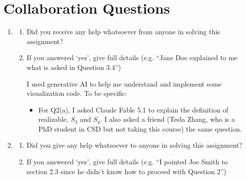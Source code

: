 \section{Collaboration Questions}

\begin{enumerate}
    \item
    \begin{enumerate}
        \item Did you receive any help whatsoever from anyone in solving this assignment?

        \item If you answered `yes', give full details (e.g. “Jane Doe explained to me what is asked in Question 3.4”)\\

        \begin{tcolorbox}[fit,height=4cm, width=15cm, blank, borderline={1pt}{-2pt},nobeforeafter]

        I used generative AI to help me understand and implement some visualization code. To be specific:
            \begin{itemize}
                \item For Q2(a), I asked Claude Fable 5.1 to explain the definition of realizable, $S_3$ and $S_4$. I also asked a friend (Tesla Zhang, who is a PhD student in CSD but not taking this course) the same question.
            \end{itemize}

        \end{tcolorbox}

    \end{enumerate}


    \item
    \begin{enumerate}
        \item Did you give any help whatsoever to anyone in solving this assignment?


        \item If you answered `yes', give full details (e.g. “I pointed Joe Smith to section 2.3 since he didn’t know how to proceed with Question 2”)\\

        \begin{tcolorbox}[fit,height=4cm, width=15cm, blank, borderline={1pt}{-2pt},nobeforeafter]


        \end{tcolorbox}

    \end{enumerate}


\end{enumerate}
